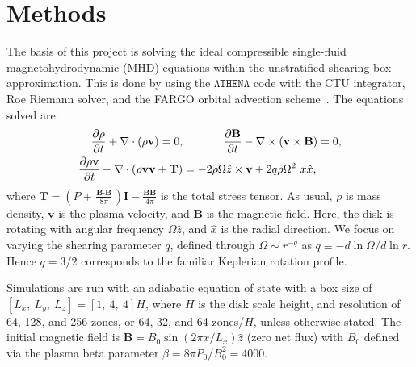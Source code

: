 \documentclass{epsconf}
\newcommand{\bb}[1]{\textbf{#1}}
\begin{document}
\section{Methods} 
The basis of this project is solving the ideal compressible single-fluid magnetohydrodynamic (MHD) equations within the unstratified shearing box approximation. This is done by using the $\texttt{ATHENA}$ code with the CTU integrator, Roe Riemann solver, and the FARGO orbital advection scheme~\cite{StoneGardiner2010}. The equations solved are:
\begin{align}
    \frac{\partial\rho}{\partial t}+\nabla\cdot(\rho\bb{v})=0, &\hspace{.5in}  \frac{\partial\bb{B}}{\partial t} - \nabla\times(\bb{v}\times\bb{B})=0, \\
    \frac{\partial\rho\bb{v}}{\partial t} + \nabla\cdot(\rho\bb{vv}+\bb{T})&= -2\rho\Omega\hat z\times\bb{v}+2q\rho\Omega^2~x\hat x,
\end{align}
where $\bb{T} = \left(P+\frac{\bb{B}\cdot\bb{B}}{8\pi}\right)\bb{I}-\frac{\bb{BB}}{4\pi}$ is the total stress tensor. As usual, $\rho$ is mass density, $\bb{v}$ is the plasma velocity, and $\bb{B}$ is the magnetic field. Here, the disk is rotating with angular frequency $\Omega\hat z$, and $\hat x$ is the radial direction. We focus on varying the shearing parameter $q$, defined through $\Omega\sim r^{-q}$ as $q\equiv-d\ln\Omega/d\ln r$. Hence $q=3/2$ corresponds to the familiar Keplerian rotation profile.

Simulations are run with an adiabatic equation of state with a box size of $[L_x,~L_y,~L_z] = [1,~4,~4] H$, where $H$ is the disk scale height, and resolution of 64, 128, and 256 zones, or 64, 32, and 64 zones/$H$, unless otherwise stated. The initial magnetic field is $\bb{B}=B_0\sin(2\pi x/L_x)\hat z$ (zero net flux) with $B_0$ defined via the plasma beta parameter $\beta = 8\pi P_0/B_0^2 = 4000$. 
\end{document}
